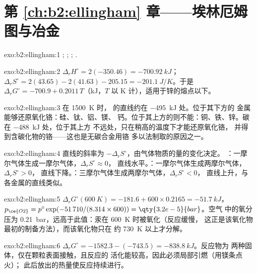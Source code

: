 \section*{第 \ref{ch:b2:ellingham} 章——埃林厄姆图与冶金}

\begin{solution}{exo:b2:ellingham:1}
; ; ;
.
\end{solution}

\begin{solution}{exo:b2:ellingham:2}
$\Delta_r H^\circ = 2(-350.46) = \qty{-700.92}{kJ}$；$\Delta_r S^\circ = 2(43.65)
- 2(41.63) - 205.15 = \qty{-201.1}{J/K}$。于是 $\Delta_r G^\circ = -700.9 +
0.2011\,T$（\unit{kJ}，$T$ 以 \unit{K} 计），适用于锌的熔点以下。
\end{solution}

\begin{solution}{exo:b2:ellingham:3}
在 \qty{1500}{K} 时， 的直线约在 \qty{-495}{kJ} 处。位于其下方的
金属能够还原氧化铬：硅、钛、铝、镁、
钙。位于其上方的则不能：铜、铁、锌。碳在 \qty{-488}{kJ} 处，位于其上方
不远处，只在稍高的温度下才能还原氧化铬，
并得到含碳化物的铬——这也是无碳合金用铬
多以法制取的原因之一。
\end{solution}

\begin{solution}{exo:b2:ellingham:4}
直线的斜率为 $-\Delta_r S^\circ$，由气体物质的量的变化决定。
：一摩尔气体生成一摩尔气体，$\Delta_r S^\circ \approx 0$，
直线水平。：一摩尔气体生成两摩尔气体，$\Delta_r S^\circ > 0$，
直线下降。：三摩尔气体生成两摩尔气体，$\Delta_r S^\circ < 0$，
直线上升，与各金属的直线类似。
\end{solution}

\begin{solution}{exo:b2:ellingham:5}
$\Delta_r G^\circ(\qty{600}{K}) = -181.6 + 600 \times 0.2165 = \qty{-51.7}{kJ}$，
$p_{\ce{O2}} = p^\circ\exp(-51\,710/(8.314 \times 600)) = \qty{3.2e-5}{bar}$。空气
中的氧分压为 \qty{0.21}{bar}，远高于此值：汞在 \qty{600}{K} 时被氧化（反应缓慢，
这正是该氧化物最初的制备方法），而该氧化物只在
约 \qty{730}{K} 以上才分解。
\end{solution}

\begin{solution}{exo:b2:ellingham:6}
$\Delta_r G^\circ = -1582.3 - (-743.5) = \qty{-838.8}{kJ}$。反应物为
两种固体，仅在颗粒表面接触，且反应的
活化能较高，因此必须局部引燃（用镁条点火）；
此后放出的热量使反应持续进行。
\end{solution}

